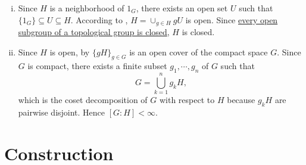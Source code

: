 \documentclass{report}
\begin{document}
\begin{prf}
	\begin{enumerate}[(i)]
		\item Since $H$ is a neighborhood of $1_G$, there exists an open set $U$ such that $\{1_G\}\subseteq U\subseteq H$. According to , $H=\cup_{g\in H}gU$ is open. Since \hyperref[th:open_subgroup_is_closed]{every open subgroup of a topological group is closed}, $H$ is closed.
		\item Since $H$ is open, by  $\{gH\}_{g\in G}$ is an open cover of the compact space $G$. Since $G$ is compact, there exists a finite subset ${g_1,\cdots,g_n}$ of $G$ such that 
		\[
		G=\bigcup_{k=1}^n g_kH,
		\]
		which is the coset decomposition of $G$ with respect to $H$ because $g_kH$ are pairwise disjoint. Hence $[G:H]<\infty$.
	\end{enumerate}
\end{prf}

\section{Construction}
\end{document}
